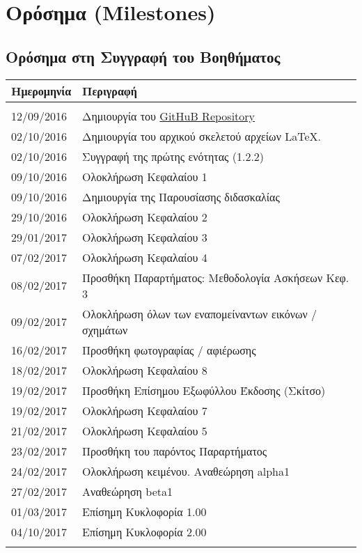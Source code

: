 \chapter{Ορόσημα (Milestones)}
\newpage
\section{Ορόσημα στη Συγγραφή του Βοηθήματος}

\begin{tabular}{ll}
\textbf{Ημερομηνία} & \textbf{Περιγραφή} \\
\hline\\
 12/09/2016 & Δημιουργία του \href{https://github.com/sonic2000gr/diktia}{GitHuB Repository}\\ 
 02/10/2016 & Δημιουργία του αρχικού σκελετού αρχείων \LaTeX.\\
 02/10/2016 & Συγγραφή της πρώτης ενότητας (1.2.2)\\
 09/10/2016 & Ολοκλήρωση Κεφαλαίου 1\\
 09/10/2016 & Δημιουργία της Παρουσίασης διδασκαλίας\\
 29/10/2016 & Ολοκλήρωση Κεφαλαίου 2\\
 29/01/2017 & Ολοκλήρωση Κεφαλαίου 3\\
 07/02/2017 & Ολοκλήρωση Κεφαλαίου 4\\
 08/02/2017 & Προσθήκη Παραρτήματος: Μεθοδολογία Ασκήσεων Κεφ. 3\\
 09/02/2017 & Ολοκλήρωση όλων των εναπομείναντων εικόνων / σχημάτων\\
 16/02/2017 & Προσθήκη φωτογραφίας / αφιέρωσης\\
 18/02/2017 & Ολοκλήρωση Κεφαλαίου 8\\
 19/02/2017 & Προσθήκη Επίσημου Εξωφύλλου Έκδοσης (Σκίτσο)\\
 19/02/2017 & Ολοκλήρωση Κεφαλαίου 7\\
 21/02/2017 & Ολοκλήρωση Κεφαλαίου 5\\
 23/02/2017 & Προσθήκη του παρόντος Παραρτήματος\\
 24/02/2017 & Ολοκλήρωση κειμένου. Αναθεώρηση alpha1\\
 27/02/2017 & Αναθεώρηση beta1\\
 01/03/2017 & Επίσημη Κυκλοφορία 1.00\\
 04/10/2017 & Επίσημη Κυκλοφορία 2.00\\\\
\hline
\end{tabular}

